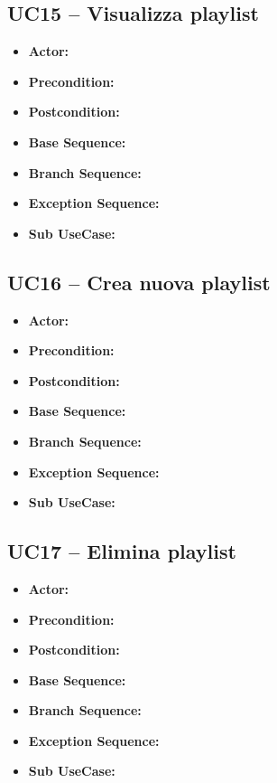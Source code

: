 \subsection{\textbf{UC15 -- Visualizza playlist}}
\begin{itemize}
    \item \textbf{Actor:}
    \item \textbf{Precondition:}
    \item \textbf{Postcondition:}
    \item \textbf{Base Sequence:}
    \item \textbf{Branch Sequence:}
    \item \textbf{Exception Sequence:}
    \item \textbf{Sub UseCase:}
\end{itemize}

\subsection{\textbf{UC16 -- Crea nuova playlist}}
\begin{itemize}
    \item \textbf{Actor:}
    \item \textbf{Precondition:}
    \item \textbf{Postcondition:}
    \item \textbf{Base Sequence:}
    \item \textbf{Branch Sequence:}
    \item \textbf{Exception Sequence:}
    \item \textbf{Sub UseCase:}
\end{itemize}

\subsection{\textbf{UC17 -- Elimina playlist}}
\begin{itemize}
    \item \textbf{Actor:}
    \item \textbf{Precondition:}
    \item \textbf{Postcondition:}
    \item \textbf{Base Sequence:}
    \item \textbf{Branch Sequence:}
    \item \textbf{Exception Sequence:}
    \item \textbf{Sub UseCase:}
\end{itemize}

